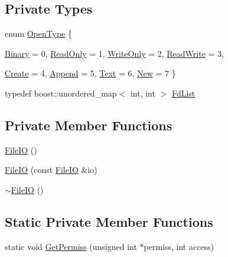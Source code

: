 \subsection*{Private Types}
\begin{DoxyCompactItemize}
\item 
enum \hyperlink{classmocha_1_1_file_i_o_a0fc42568b39966bf458cad23ebd4592b}{OpenType} \{ \par
\hyperlink{classmocha_1_1_file_i_o_a0fc42568b39966bf458cad23ebd4592ba5a926b3e3cec0258e0e72c09a57b1adc}{Binary} =  0, 
\hyperlink{classmocha_1_1_file_i_o_a0fc42568b39966bf458cad23ebd4592ba6a6781f4bb593323b7e9a09a62c45a48}{ReadOnly} =  1, 
\hyperlink{classmocha_1_1_file_i_o_a0fc42568b39966bf458cad23ebd4592ba32eacb43edc2c4a9b846ff03e3d10bbc}{WriteOnly} =  2, 
\hyperlink{classmocha_1_1_file_i_o_a0fc42568b39966bf458cad23ebd4592bad1e1a88fb630fb3ee8592942896f0acb}{ReadWrite} =  3, 
\par
\hyperlink{classmocha_1_1_file_i_o_a0fc42568b39966bf458cad23ebd4592ba827e8d86378cd10098ab7711460b004f}{Create} =  4, 
\hyperlink{classmocha_1_1_file_i_o_a0fc42568b39966bf458cad23ebd4592bafb7a1c2e702815da7a98f519f54e623c}{Append} =  5, 
\hyperlink{classmocha_1_1_file_i_o_a0fc42568b39966bf458cad23ebd4592ba2929a48da17d24e6c50cc3bd0aea9269}{Text} =  6, 
\hyperlink{classmocha_1_1_file_i_o_a0fc42568b39966bf458cad23ebd4592ba9516a0e162683c5eabf14b8c52e9812d}{New} =  7
 \}
\item 
typedef boost::unordered\_\-map$<$ int, int $>$ \hyperlink{classmocha_1_1_file_i_o_a82c5c99d9000ae1e0795338dcdd9364d}{FdList}
\end{DoxyCompactItemize}
\subsection*{Private Member Functions}
\begin{DoxyCompactItemize}
\item 
\hyperlink{classmocha_1_1_file_i_o_aad9656d5b6b15dde0c44fbf069027cef}{FileIO} ()
\item 
\hyperlink{classmocha_1_1_file_i_o_a24ab41b598ee5823ef18b3a65831836d}{FileIO} (const \hyperlink{classmocha_1_1_file_i_o}{FileIO} \&io)
\item 
\hyperlink{classmocha_1_1_file_i_o_ab64ed86fe04d2ea7af3bd1781759f7a9}{$\sim$FileIO} ()
\end{DoxyCompactItemize}
\subsection*{Static Private Member Functions}
\begin{DoxyCompactItemize}
\item 
static void \hyperlink{classmocha_1_1_file_i_o_af5aec77f34df27442b4f6a38b2808cba}{GetPermiss} (unsigned int $\ast$permiss, int access)
\end{DoxyCompactItemize}
